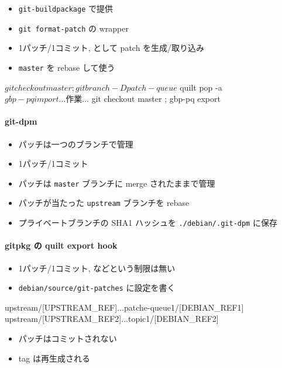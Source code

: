 \documentclass[mingoth,a4paper]{jsarticle}
\begin{document}
\begin{itemize}
\item \texttt{git-buildpackage} で提供
\item \texttt{git format-patch} の wrapper
\item 1パッチ/1コミット, として patch を生成/取り込み
\item \texttt{master} を rebase して使う
\end{itemize}

\begin{commandline}
$ git checkout master ; git branch -D patch-queue
$ quilt pop -a
$ gbp-pq import
 ... 作業 ...
$ git checkout master ; gbp-pq export
\end{commandline}

\paragraph{git-dpm}


\begin{itemize}
\item パッチは一つのブランチで管理
\item 1パッチ/1コミット
\item パッチは \texttt{master} ブランチに merge されたままで管理
\item パッチが当たった \texttt{upstream} ブランチを rebase
\item プライベートブランチの SHA1 ハッシュを
      \texttt{./debian/.git-dpm} に保存
\end{itemize}

\paragraph{gitpkg の quilt export hook}


\begin{itemize}
\item 1パッチ/1コミット, などという制限は無い
\item \texttt{debian/source/git-patches} に設定を書く
\end{itemize}
    \begin{commandline}
    upstream/[UPSTREAM_REF]...patche-queue1/[DEBIAN_REF1]
    upstream/[UPSTREAM_REF2]...topic1/[DEBIAN_REF2]
    \end{commandline}
\begin{itemize}
\item パッチはコミットされない
\item tag は再生成される
\end{itemize}
\end{document}
